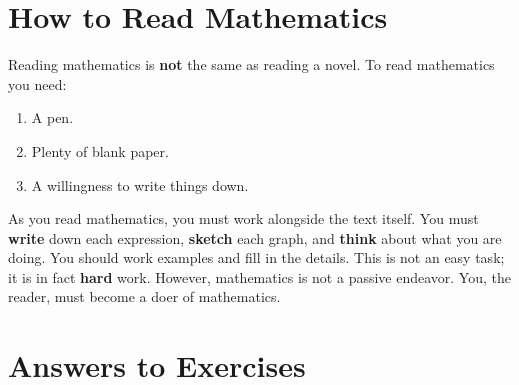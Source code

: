 \documentclass[justified,openany,nofonts]{tufte-book}
\begin{document}
\chapter*{How to Read Mathematics}

Reading mathematics is \textbf{not} the same as reading a
novel. To read mathematics you need: 
\begin{enumerate}
\item A pen. 
\item Plenty of blank paper. 
\item A willingness to write things down.
\end{enumerate}
As you read mathematics, you must work alongside the text
itself. You must \textbf{write} down each expression, \textbf{sketch}
each graph, and \textbf{think} about what you are doing. You should
work examples and fill in the details. This is not an easy task; it is
in fact \textbf{hard} work. However, mathematics is not a passive
endeavor. You, the reader, must become a doer of mathematics.



\setcounter{chapter}{-1}





















%
%

\finalizeanswers
\chapter*{Answers to Exercises}
\small
{}
\normalsize
\backmatter
\printindex
\end{document}
